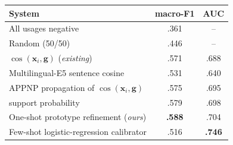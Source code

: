 \begin{tabular}{@{}lcc@{}}
\toprule
System & macro-F1 & AUC \\
\midrule
All usages negative & .361 & -- \\
Random (50/50) & .446 & -- \\
\midrule
$\cos(\mathbf{x}_i,\mathbf{g})$ (\emph{existing}) & .571 & .688 \\
Multilingual-E5 sentence cosine & .531 & .640 \\
APPNP propagation of $\cos(\mathbf{x}_i,\mathbf{g})$ & .575 & .695 \\
\sys{} support probability & .579 & .698 \\
One-shot prototype refinement (\emph{ours}) & \textbf{.588} & .704 \\
Few-shot logistic-regression calibrator & .516 & \textbf{.746} \\
\bottomrule
\end{tabular}
